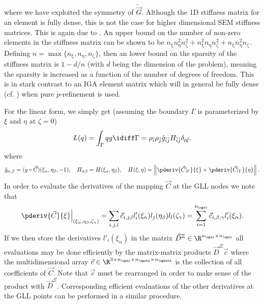 where we have exploited the symmetry of $\tilde{\vec{G}}$. Although the 1D stiffness matrix for an element is fully dense, this is not the case for higher dimensional SEM stiffness matrices. This is again due to . An upper bound on the number of non-zero elements in the stiffness matrix can be shown to be $n_\upxi n_\upeta^2 n_\upzeta^2+n_\upxi^2 n_\upeta n_\upzeta^2+n_\upxi n_\upeta^2 n_\upzeta$. Defining $n=\max\{n_\upxi, n_\upeta, n_\upzeta\}$, then an lower bound on the sparsity of the stiffness matrix is $1-d/n$ (with $d$ being the dimension of the problem), meaning the sparsity is increased as a function of the number of degrees of freedom. This is in stark contrast to an IGA element matrix which will in general be fully dense (cf.  \cite{Gervasio2018cia}) when pure $\check{p}$-refinement is used.

For the linear form, we simply get (assuming the boundary $\Gamma$ is parameterized by $\xi$ and $\eta$ at $\zeta = 0$)
\begin{equation*}
	L(q) = \int_{\Gamma} qg\idiff\Gamma =  \rho_{\tilde{i}}\rho_{\tilde{j}}\hat{g}_{\tilde{i}\tilde{j}}H_{\tilde{i}\tilde{j}}\delta_{0\tilde{l}}.
\end{equation*}
where
\begin{equation*}
	\hat{g}_{\alpha,\beta} = (g\circ \vec{C})(\xi_\alpha,\eta_\beta,-1),\quad H_{\alpha\beta} = H(\xi_\alpha,\eta_\beta), \quad H(\xi,\eta) = \left\|\pderiv{\vec{C}|_\Gamma}{\xi}\times\pderiv{\vec{C}|_\Gamma}{\eta}\right\|.
\end{equation*}
In order to evaluate the derivatives of the mapping $\vec{C}$ at the GLL nodes we note that
\begin{equation*}
	\left.\pderiv{\vec{C}}{\xi}\right|_{(\xi_\alpha,\eta_\beta,\zeta_\gamma)} = \sum_{i,j,l}\vec{c}_{i,j,l} l'_i(\xi_\alpha)l_j(\eta_\beta)l_l(\zeta_\gamma) = \sum_{i=1}^{n_\upxi}\vec{c}_{i,\beta,\gamma} l'_i(\xi_\alpha).
\end{equation*}
If we then store the derivatives $l'_i(\xi_\alpha)$ in the matrix $\vec{D}^\Xi\in\R^{n_\upxi\times n_\upxi}$ all evaluations may be done efficiently by the matrix-matrix products $\vec{D}^\Xi\vec{c}$ where the multidimensional array $\vec{c}\in\R^{3\times n_\upxi\times n_\upeta\times n_\upzeta}$ is the collection of all coefficients of $\vec{C}$. Note that $\vec{c}$ must be rearranged in order to make sense of the product with $\vec{D}^\Xi$. Corresponding efficient evaluations of the other derivatives at the GLL points can be performed in a similar procedure. 

